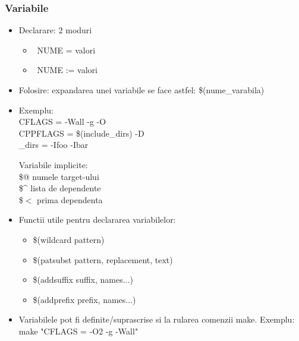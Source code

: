 \documentclass{beamer}
\begin{document}
    \begin{frame}[allowframebreaks]
    \frametitle{Variabile}
    \begin{itemize}
    \setlength{\itemsep}{0.5cm}
    \item Declarare: 2 moduri\\
        \begin{itemize}
        \item {\ttfamily\ NUME = valori}
        \item {\ttfamily\ NUME := valori}
        \end{itemize}
    \item Folosire: expandarea unei variabile se face astfel: {\ttfamily\$(nume\_varabila)}
    \item Exemplu:\\{\ttfamily CFLAGS = -Wall -g -O\\CPPFLAGS = \$(include\_dirs) -D\\_dirs = -Ifoo -Ibar}
    \begin{item}
    Variabile implicite:\\
    \$@ numele target-ului\\
    \$\^{} lista de dependente\\
    \$$<$ prima dependenta
    \end{item}
    \item Functii utile pentru declararea variabilelor:\\\begin{itemize}\item \$(wildcard pattern)\item \$(patsubst pattern, replacement, text)\item \$(addsuffix suffix, names...)\item \$(addprefix prefix, names...)\end{itemize}
    \item Variabilele pot fi definite/suprascrise si la rularea comenzii make. Exemplu:\\{\ttfamily make "CFLAGS = -O2 -g -Wall"}
    \end{itemize}
    \end{frame}
\end{document}
